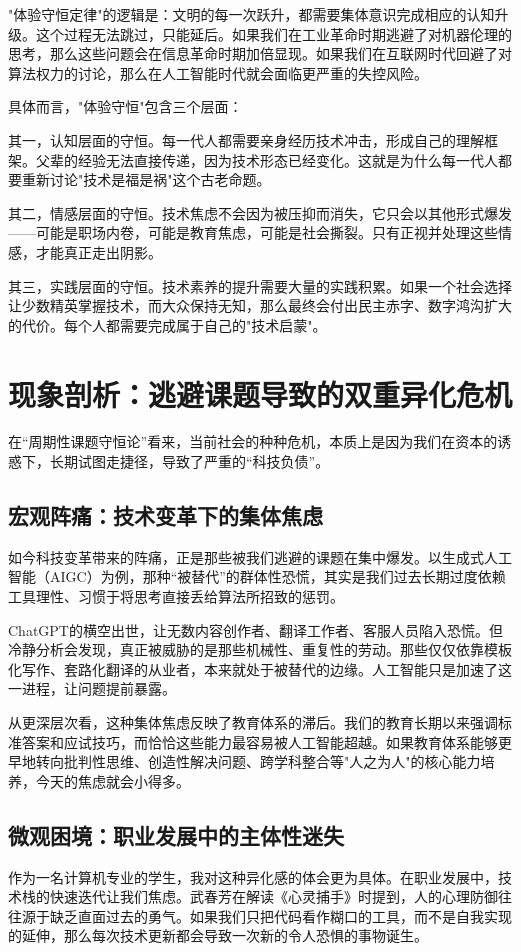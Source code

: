 \documentclass[a4paper,12pt]{ctexart}
\begin{document}
"体验守恒定律"的逻辑是：文明的每一次跃升，都需要集体意识完成相应的认知升级。这个过程无法跳过，只能延后。如果我们在工业革命时期逃避了对机器伦理的思考，那么这些问题会在信息革命时期加倍显现。如果我们在互联网时代回避了对算法权力的讨论，那么在人工智能时代就会面临更严重的失控风险。

具体而言，"体验守恒"包含三个层面：

其一，认知层面的守恒。每一代人都需要亲身经历技术冲击，形成自己的理解框架。父辈的经验无法直接传递，因为技术形态已经变化。这就是为什么每一代人都要重新讨论"技术是福是祸"这个古老命题。

其二，情感层面的守恒。技术焦虑不会因为被压抑而消失，它只会以其他形式爆发——可能是职场内卷，可能是教育焦虑，可能是社会撕裂。只有正视并处理这些情感，才能真正走出阴影。

其三，实践层面的守恒。技术素养的提升需要大量的实践积累。如果一个社会选择让少数精英掌握技术，而大众保持无知，那么最终会付出民主赤字、数字鸿沟扩大的代价。每个人都需要完成属于自己的"技术启蒙"。


\section{现象剖析：逃避课题导致的双重异化危机}

在“周期性课题守恒论”看来，当前社会的种种危机，本质上是因为我们在资本的诱惑下，长期试图走捷径，导致了严重的“科技负债”。

\subsection{宏观阵痛：技术变革下的集体焦虑}
如今科技变革带来的阵痛，正是那些被我们逃避的课题在集中爆发。以生成式人工智能（AIGC）为例，那种“被替代”的群体性恐慌，其实是我们过去长期过度依赖工具理性、习惯于将思考直接丢给算法所招致的惩罚。

ChatGPT的横空出世，让无数内容创作者、翻译工作者、客服人员陷入恐慌。但冷静分析会发现，真正被威胁的是那些机械性、重复性的劳动。那些仅仅依靠模板化写作、套路化翻译的从业者，本来就处于被替代的边缘。人工智能只是加速了这一进程，让问题提前暴露。

从更深层次看，这种集体焦虑反映了教育体系的滞后。我们的教育长期以来强调标准答案和应试技巧，而恰恰这些能力最容易被人工智能超越。如果教育体系能够更早地转向批判性思维、创造性解决问题、跨学科整合等"人之为人"的核心能力培养，今天的焦虑就会小得多。

\subsection{微观困境：职业发展中的主体性迷失}
作为一名计算机专业的学生，我对这种异化感的体会更为具体。在职业发展中，技术栈的快速迭代让我们焦虑。武春芳在解读《心灵捕手》时提到，人的心理防御往往源于缺乏直面过去的勇气。如果我们只把代码看作糊口的工具，而不是自我实现的延伸，那么每次技术更新都会导致一次新的令人恐惧的事物诞生。
\end{document}
